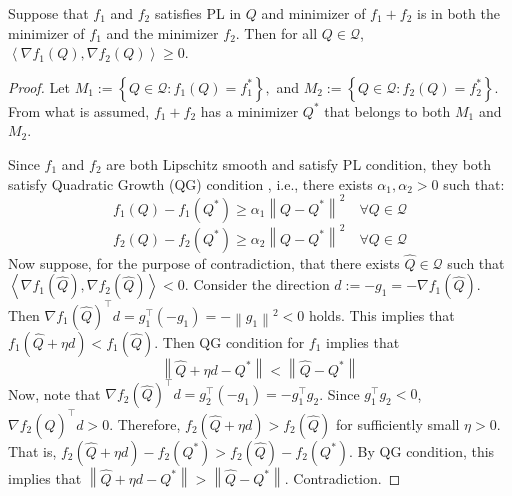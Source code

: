 \begin{lem}\label{lem:crossPos}
Suppose that $f_1$ and $f_2$ satisfies PL in $Q$ and minimizer of $f_1+f_2$ is in both the minimizer of $f_1$ and the minimizer $f_2$. Then for all $Q\in\mathcal{Q}$, $\left\langle\nabla f_1(Q), \nabla f_2(Q)\right\rangle \geq 0$.
    
\end{lem}
\begin{proof}
 Let $M_1:=\left\{Q \in \mathcal{Q}: f_1(Q)=f_1^*\right\}, $ and $ M_2:=\left\{Q \in \mathcal{Q}: f_2(Q)=f_2^*\right\}$. From what is assumed, $f_1+f_2$ has a minimizer $Q^*$ that belongs to both $M_1$ and $M_2$.

    Since $f_1$ and $f_2$ are both Lipschitz smooth and satisfy PL condition, they both satisfy Quadratic Growth (QG) condition \cite{liao2024error}, i.e., 
    there exists $\alpha_1, \alpha_2>0$ such that:
$$
f_1(Q)-f_1\left(Q^*\right) \geq \alpha_1\left\|Q-Q^*\right\|^2 \quad \forall Q\in\mathcal{Q}
$$
$$
f_2(Q)-f_2\left(Q^*\right) \geq \alpha_2\left\|Q-Q^*\right\|^2 \quad \forall Q\in\mathcal{Q}
$$
Now suppose, for the purpose of contradiction, that there exists $\hat{Q}\in\mathcal{Q}$ such that $\left\langle\nabla f_1(\hat{Q}), \nabla f_2(\hat{Q})\right\rangle<0$. Consider the direction $d:=-g_1=-\nabla f_1(\hat{Q})$. Then $\nabla f_1(\hat{Q})^{\top} d=g_1^{\top}\left(-g_1\right)=-\left\|g_1\right\|^2<0$ holds. This implies that $f_1(\hat{Q}+\eta d)<f_1(\hat{Q})$. Then QG condition for $f_1$ implies that
$$
\left\|\hat{Q}+\eta d-Q^*\right\|<\left\|\hat{Q}-Q^*\right\|
$$
Now, note that $\nabla f_2(\hat{Q})^{\top} d=g_2^{\top}\left(-g_1\right)=-g_1^{\top} g_2$. Since $g_1^{\top} g_2<0$, $\nabla f_2(\hat{Q})^{\top} d>0$. Therefore, $f_2(\hat{Q}+\eta d)>f_2(\hat{Q})$ for sufficiently small $\eta>0$. That is, $f_2(\hat{Q}+\eta d)-f_2(Q^\ast)>f_2(\hat{Q})-f_2(Q^\ast)$. By QG condition, this implies that $\left\|\hat{Q}+\eta d-Q^*\right\| >\left\|\hat{Q}-Q^*\right\|$. Contradiction.

\end{proof}




